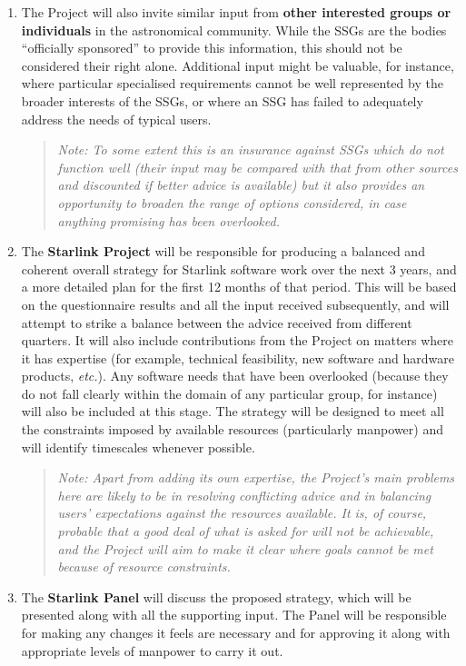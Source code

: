 \documentclass[twoside,11pt]{article}
\newcommand{\htmladdnormallink}[2]{#1}
\newcommand{\xref}[3]{#1}
\newcommand{\planref}[1]{\htmladdnormallink{#1}{http://star-www.rl.ac.uk/\~{}rfws/projects/planitems.html}}
\newcommand{\st}[1]{{\em{#1}}}
\newcommand{\qt}[1]{``#1''}
\newcommand{\qt}[1]{{\tt{"}}#1{\tt{"}}}
\begin{document}
\begin{enumerate}
\item The Project will also invite similar input from {\bf other
interested groups or individuals} in the astronomical community.  While
the SSGs are the bodies \qt{officially sponsored} to provide this
information, this should not be considered their right
alone. Additional input might be valuable, for instance, where
particular specialised requirements cannot be well represented by the
broader interests of the SSGs, or where an SSG has failed to
adequately address the needs of typical users.

\begin{quote}
\st{Note: To some extent this is an insurance against SSGs which do
not function well (their input may be compared with that from other
sources and discounted if better advice is available) but it also
provides an opportunity to broaden the range of options considered, in
case anything promising has been overlooked.}
\end{quote}

\item The {\bf Starlink Project} will be responsible for producing a
balanced and coherent overall \xref{strategy}{sgp42}{} for Starlink
software work over the next 3 years, and a more detailed
\planref{plan} for the first 12 months of that period. This will be
based on the questionnaire results and all the input received
subsequently, and will attempt to strike a balance between the advice
received from different quarters. It will also include contributions
from the Project on matters where it has expertise (for example,
technical feasibility, new software and hardware products,
\st{etc.}). Any software needs that have been overlooked (because they
do not fall clearly within the domain of any particular group, for
instance) will also be included at this stage. The strategy will be
designed to meet all the constraints imposed by available resources
(particularly manpower) and will identify timescales whenever
possible.

\begin{quote}
\st{Note: Apart from adding its own expertise, the Project's main
problems here are likely to be in resolving conflicting advice and in
balancing users' expectations against the resources available. It is,
of course, probable that a good deal of what is asked for will not be
achievable, and the Project will aim to make it clear where goals
cannot be met because of resource constraints.}
\end{quote}

\item The {\bf Starlink Panel} will discuss the proposed strategy, which
will be presented along with all the supporting input. The Panel will be
responsible for making any changes it feels are necessary and for
approving it along with appropriate levels of manpower to carry it out.


\end{enumerate}
\end{document}
